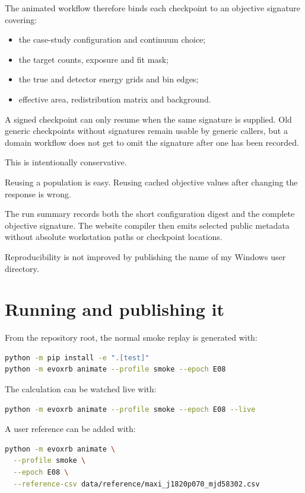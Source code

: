 \documentclass[11pt]{article}
\begin{document}
The animated workflow therefore binds each checkpoint to an objective signature
covering:

\begin{itemize}
  \item the case-study configuration and continuum choice;
  \item the target counts, exposure and fit mask;
  \item the true and detector energy grids and bin edges;
  \item effective area, redistribution matrix and background.
\end{itemize}

A signed checkpoint can only resume when the same signature is supplied. Old
generic checkpoints without signatures remain usable by generic callers, but a
domain workflow does not get to omit the signature after one has been recorded.

This is intentionally conservative.

Reusing a population is easy. Reusing cached objective values after changing
the response is wrong.

The run summary records both the short configuration digest and the complete
objective signature. The website compiler then emits selected public metadata
without absolute workstation paths or checkpoint locations.

Reproducibility is not improved by publishing the name of my Windows user
directory.

\section{Running and publishing it}

From the repository root, the normal smoke replay is generated with:

\begin{lstlisting}[language=bash]
python -m pip install -e ".[test]"
python -m evoxrb animate --profile smoke --epoch E08
\end{lstlisting}

The calculation can be watched live with:

\begin{lstlisting}[language=bash]
python -m evoxrb animate --profile smoke --epoch E08 --live
\end{lstlisting}

A user reference can be added with:

\begin{lstlisting}[language=bash]
python -m evoxrb animate \
  --profile smoke \
  --epoch E08 \
  --reference-csv data/reference/maxi_j1820p070_mjd58302.csv
\end{lstlisting}
\end{document}
